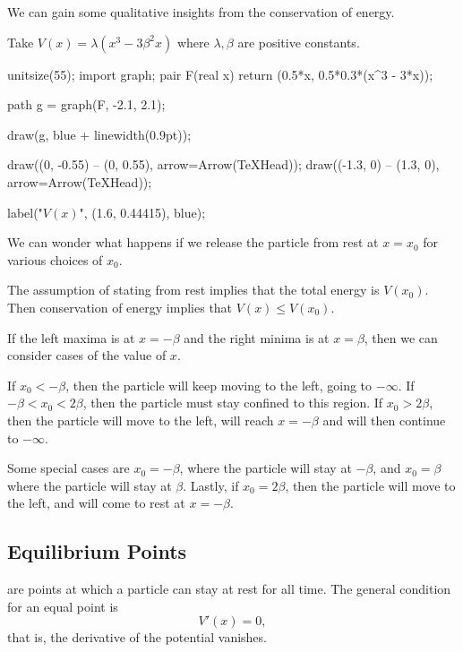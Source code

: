 \documentclass[a4paper]{scrartcl}
\newcommand{\newsection}{\subsection}
\begin{document}
We can gain some qualitative insights from the conservation of energy.

\begin{example}
	Take $V(x) = \lambda(x^3 - 3 \beta^2 x)$ where $\lambda, \beta$ are positive constants.
	\begin{center}
		\begin{asy}
			unitsize(55);
			import graph;
			pair F(real x) {
				return (0.5*x, 0.5*0.3*(x^3 - 3*x));
			}
	
			path g = graph(F, -2.1, 2.1);
	
			draw(g, blue + linewidth(0.9pt));
	
			draw((0, -0.55) -- (0, 0.55), arrow=Arrow(TeXHead));
			draw((-1.3, 0) -- (1.3, 0), arrow=Arrow(TeXHead));

			label("$V(x)$", (1.6, 0.44415), blue);
		\end{asy}
	\end{center}
	We can wonder what happens if we release the particle from rest at $x=x_0$ for various choices of $x_0$. 

	The assumption of stating from rest implies that the total energy is $V(x_0)$. Then conservation of energy implies that $V(x) \leq V(x_0)$.

	If the left maxima is at $x = -\beta$ and the right minima is at $x = \beta$, then we can consider cases of the value of $x$. 

	If $x_0 < -\beta$, then the particle will keep moving to the left, going to $- \infty$. If $- \beta < x_0 < 2 \beta$, then the particle must stay confined to this region. If $x_0 > 2\beta$, then the particle will move to the left, will reach $x = -\beta$ and will then continue to $- \infty$.
	
	Some special cases are $x_0 = - \beta$, where the particle will stay at $-\beta$, and $x_0 = \beta$ where the particle will stay at $\beta$. Lastly, if $x_0 = 2 \beta$, then the particle will move to the left, and will come to rest at $x = - \beta$.
\end{example}

\newsection{Equilibrium Points}

 are points at which a particle can stay at rest for all time. The general condition for an equal point is
$$
V'(x) = 0,
$$
that is, the derivative of the potential vanishes. 
\end{document}
